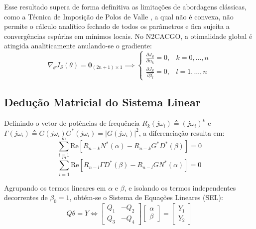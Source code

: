 \documentclass[journal,10pt,twocolumn]{IEEEtran}
\begin{document}
Esse resultado supera de forma definitiva as limitações de abordagens clássicas, como a Técnica de Imposição de Polos de Valle \cite{valle2005}, a qual não é convexa, não permite o cálculo analítico fechado de todos os parâmetros e fica sujeita a convergências espúrias em mínimos locais. No N2CACGO, a otimalidade global é atingida analiticamente anulando-se o gradiente:
\begin{equation}
    \nabla_\theta J_S(\theta) = \mathbf{0}_{(2n+1) \times 1} \implies \begin{cases}
        \frac{\partial J_S}{\partial \alpha_k} = 0, & k = 0, \dots, n \\
        \frac{\partial J_S}{\partial \beta_l} = 0, & l = 1, \dots, n
    \end{cases}
\end{equation}

\subsection{Dedução Matricial do Sistema Linear}
Definindo o vetor de potências de frequência $R_k(j\omega_i) \triangleq (j\omega_i)^k$ e $\Gamma(j\omega_i) \triangleq G(j\omega_i) G^*(j\omega_i) = |G(j\omega_i)|^2$, a diferenciação resulta em:
\begin{equation}
    \sum_{i=1}^m \text{Re} \left[ R_{n-k} N^*(\alpha) - R_{n-k} G^* D^*(\beta) \right] = 0
\end{equation}
\begin{equation}
    \sum_{i=1}^m \text{Re} \left[ R_{n-l} \Gamma D^*(\beta) - R_{n-l} G N^*(\alpha) \right] = 0
\end{equation}

Agrupando os termos lineares em $\alpha$ e $\beta$, e isolando os termos independentes decorrentes de $\beta_0 = 1$, obtém-se o Sistema de Equações Lineares (SEL):
\begin{equation}
    Q \theta = Y \iff \begin{bmatrix} Q_1 & -Q_2 \\ Q_3 & -Q_4 \end{bmatrix} \begin{bmatrix} \alpha \\ \beta \end{bmatrix} = \begin{bmatrix} Y_1 \\ Y_2 \end{bmatrix}
    \label{eq:sel_n2cacgo}
\end{equation}
\end{document}
